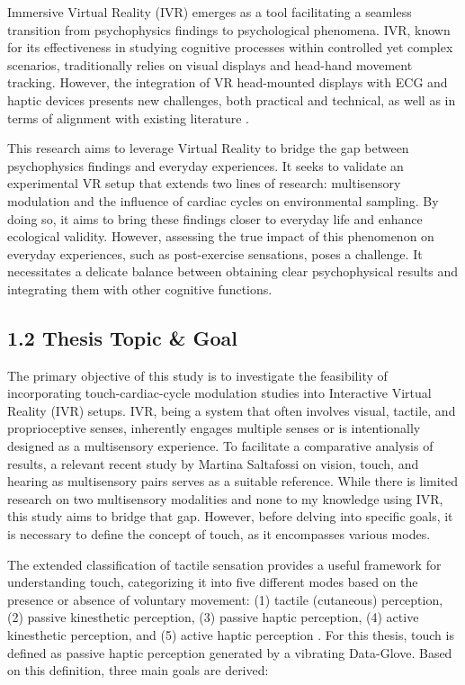 \documentclass[12pt,oneside,openright]{report}
\begin{document}
Immersive Virtual Reality (IVR) emerges as a tool facilitating a seamless transition from psychophysics findings to psychological phenomena. IVR, known for its effectiveness in studying cognitive processes within controlled yet complex scenarios, traditionally relies on visual displays and head-hand movement tracking. However, the integration of VR head-mounted displays with ECG and haptic devices presents new challenges, both practical and technical, as well as in terms of alignment with existing literature \parencite{Klotzsche2023}.

This research aims to leverage Virtual Reality to bridge the gap between psychophysics findings and everyday experiences. It seeks to validate an experimental VR setup that extends two lines of research: multisensory modulation and the influence of cardiac cycles on environmental sampling. By doing so, it aims to bring these findings closer to everyday life and enhance ecological validity. However, assessing the true impact of this phenomenon on everyday experiences, such as post-exercise sensations, poses a challenge. It necessitates a delicate balance between obtaining clear psychophysical results and integrating them with other cognitive functions.


\subsection*{1.2 Thesis Topic \& Goal}

The primary objective of this study is to investigate the feasibility of incorporating touch-cardiac-cycle modulation studies into Interactive Virtual Reality (IVR) setups. IVR, being a system that often involves visual, tactile, and proprioceptive senses, inherently engages multiple senses or is intentionally designed as a multisensory experience. To facilitate a comparative analysis of results, a relevant recent study by Martina Saltafossi on vision, touch, and hearing as multisensory pairs \parencite{SALTAFOSSI2023108642} serves as a suitable reference. While there is limited research on two multisensory modalities and none to my knowledge using IVR, this study aims to bridge that gap. However, before delving into specific goals, it is necessary to define the concept of touch, as it encompasses various modes.

The extended classification of tactile sensation provides a useful framework for understanding touch, categorizing it into five different modes based on the presence or absence of voluntary movement: (1) tactile (cutaneous) perception, (2) passive kinesthetic perception, (3) passive haptic perception, (4) active kinesthetic perception, and (5) active haptic perception \parencite{Healy2003HandbookOP}. For this thesis, touch is defined as passive haptic perception generated by a vibrating Data-Glove. Based on this definition, three main goals are derived:
\end{document}
